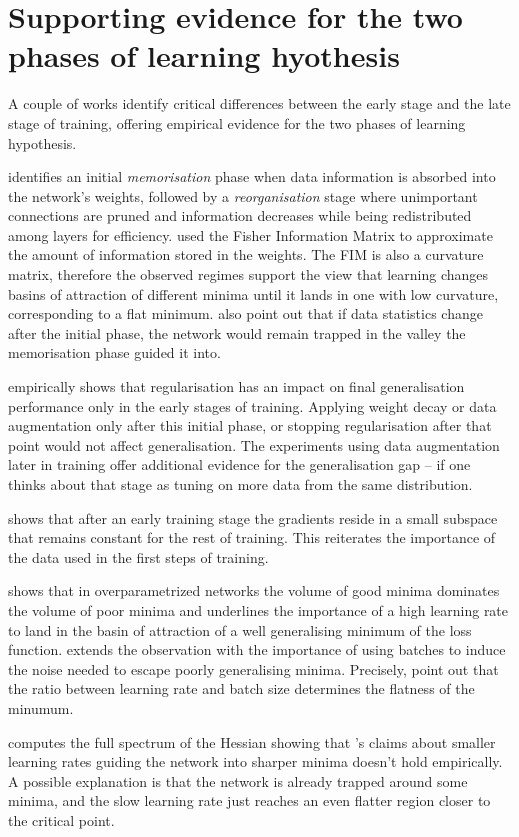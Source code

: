 \section{Supporting evidence for the two phases of learning hyothesis}
\label{sec:twophase_literature}

A couple of works identify critical differences between the early stage and the late stage of training, offering empirical evidence for the two phases of learning hypothesis.

\cite{achille2018critical} identifies an initial \textit{memorisation} phase when data information is absorbed into the network's weights, followed by a \textit{reorganisation} stage where unimportant connections are pruned and information decreases while being redistributed among layers for efficiency. \citeauthor{achille2018critical} used the Fisher Information Matrix to approximate the amount of information stored in the weights. The FIM is also a curvature matrix, therefore the observed regimes support the view that learning changes basins of attraction of different minima until it lands in one with low curvature, corresponding to a flat minimum. \citeauthor{achille2018critical} also point out that if data statistics change after the initial phase, the network would remain trapped in the valley the memorisation phase guided it into.

\cite{golatkar2019time} empirically shows that regularisation has an impact on final generalisation performance only in the early stages of training. Applying weight decay or data augmentation only after this initial phase, or stopping regularisation after that point would not affect generalisation. The experiments using data augmentation later in training offer additional evidence for the generalisation gap -- if one thinks about that stage as tuning on more data from the same distribution.

\cite{gur2018gradient} shows that after an early training stage the gradients reside in a small subspace that remains constant for the rest of training. This reiterates the importance of the data used in the first steps of training.

\cite{li2019towards} shows that in overparametrized networks the volume of good minima dominates the volume of poor minima and underlines the importance of a high learning rate to land in the basin of attraction of a well generalising minimum of the loss function. \cite{jastrzebski2020break} extends the observation with the importance of using batches to induce the noise needed to escape poorly generalising minima. Precisely, \citeauthor{jastrzebski2020break} point out that the ratio between learning rate and batch size determines the flatness of the minumum.

\cite{ghorbani2019investigation} computes the full spectrum of the Hessian showing that \citeauthor{jastrzebski2020break}'s claims about smaller learning rates guiding the network into sharper minima doesn't hold empirically. A possible explanation is that the network is already trapped around some minima, and the slow learning rate just reaches an even flatter region closer to the critical point.